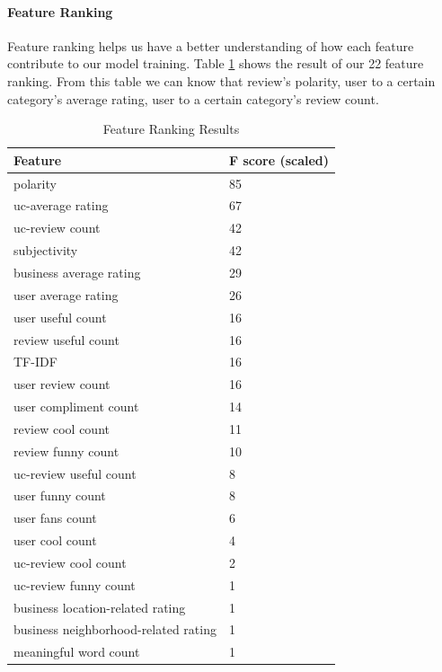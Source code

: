 \documentclass{vgtc}                          %
\begin{document}
\paragraph{Feature Ranking}
Feature ranking helps us have a better understanding of how each feature contribute to our model training. Table \ref{tb:ranking} shows the result of our 22 feature ranking. From this table we can know that review's polarity, user to a certain category's average rating, user to a certain category's review count.

\begin{table}[h]
  \small
  \centering
  \caption{Feature Ranking Results}
  \label{tb:ranking}
  \begin{tabular}{l|l}
    \hline
    \textbf{Feature}                          & \textbf{F score (scaled)}                                                                \\ \hline
    polarity     & 85                       \\ \hline
    uc-average rating      & 67                        \\ \hline
    uc-review count & 42\\ \hline
    subjectivity & 42\\ \hline
    business average rating & 29\\ \hline
    user average rating & 26\\ \hline
    user useful count & 16\\ \hline
    review useful count     & 16                       \\ \hline
    TF-IDF      & 16                        \\ \hline
    user review count & 16\\ \hline
    user compliment count & 14\\ \hline
    review cool count & 11\\ \hline
    review funny count & 10\\ \hline
    uc-review useful count& 8\\ \hline
    user funny count & 8\\ \hline
    user fans count     & 6                       \\ \hline
    user cool count      & 4                        \\ \hline
    uc-review cool count & 2\\ \hline
    uc-review funny count & 1\\ \hline
    business location-related rating & 1\\ \hline
    business neighborhood-related rating & 1\\ \hline
    meaningful word count& 1\\ \hline

  \end{tabular}
\end{table}
\end{document}
